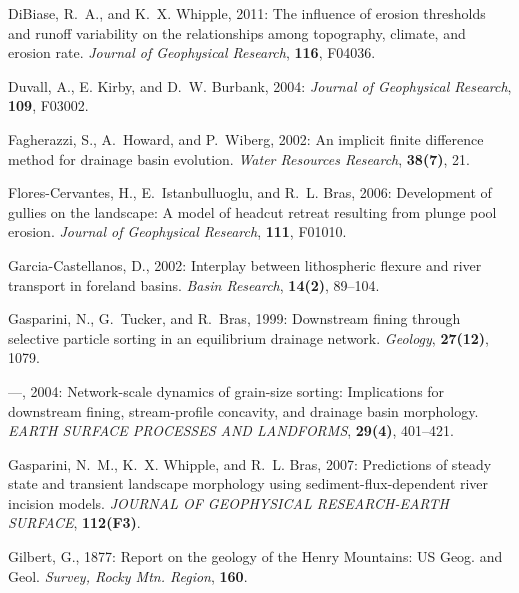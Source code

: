 \documentclass[12pt,reqno]{amsart}
\begin{document}
\begin{thebibliography}{41}
DiBiase, R.~A., and K.~X. Whipple, 2011: The influence of erosion
  thresholds and runoff variability on the relationships among
  topography, climate, and erosion rate. {\em Journal of Geophysical
  Research\/}, {\bf 116}, F04036.

Duvall, A., E. Kirby, and D.~W. Burbank, 2004: {\em Journal of
  Geophysical Research\/}, {\bf 109}, F03002. 

Fagherazzi, S., A.~Howard, and P.~Wiberg, 2002: {An implicit finite difference
  method for drainage basin evolution}. {\em Water Resources Research\/}, {\bf
  38(7)}, 21.

Flores-Cervantes, H., E.~Istanbulluoglu, and R.~L. Bras, 2006: Development of
  gullies on the landscape: A model of headcut retreat resulting from plunge
  pool erosion. {\em Journal of Geophysical Research\/}, {\bf 111}, F01010.

Garcia-Castellanos, D., 2002: {Interplay between lithospheric flexure and river
  transport in foreland basins}. {\em Basin Research\/}, {\bf 14(2)}, 89--104.

Gasparini, N., G.~Tucker, and R.~Bras, 1999: {Downstream fining through
  selective particle sorting in an equilibrium drainage network}. {\em
  Geology\/}, {\bf 27(12)}, 1079.

---, {2004}: {Network-scale dynamics of grain-size sorting: Implications for
  downstream fining, stream-profile concavity, and drainage basin morphology}.
  {\em {EARTH SURFACE PROCESSES AND LANDFORMS}\/}, {\bf {29}({4})}, {401--421}.

Gasparini, N.~M., K.~X. Whipple, and R.~L. Bras, {2007}: {Predictions of steady
  state and transient landscape morphology using sediment-flux-dependent river
  incision models}. {\em {JOURNAL OF GEOPHYSICAL RESEARCH-EARTH SURFACE}\/},
  {\bf {112}({F3})}.

Gilbert, G., 1877: {Report on the geology of the Henry Mountains: US Geog. and
  Geol}. {\em Survey, Rocky Mtn. Region\/}, {\bf 160}.


\end{thebibliography}
\end{document}
